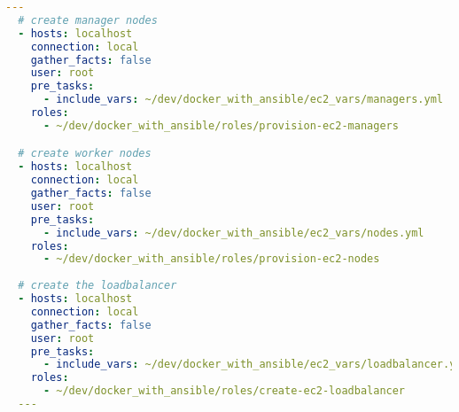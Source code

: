 \begin{lstlisting}[float,floatplacement=!ht,language=yaml,caption={create-instances.yml},label={lst:provisionEc2},basicstyle=\small]
  ---
  # create manager nodes 
  - hosts: localhost
    connection: local
    gather_facts: false
    user: root
    pre_tasks:
      - include_vars: ~/dev/docker_with_ansible/ec2_vars/managers.yml
    roles:
      - ~/dev/docker_with_ansible/roles/provision-ec2-managers

  # create worker nodes
  - hosts: localhost
    connection: local
    gather_facts: false
    user: root
    pre_tasks:
      - include_vars: ~/dev/docker_with_ansible/ec2_vars/nodes.yml
    roles:
      - ~/dev/docker_with_ansible/roles/provision-ec2-nodes
      
  # create the loadbalancer
  - hosts: localhost
    connection: local
    gather_facts: false
    user: root
    pre_tasks:
      - include_vars: ~/dev/docker_with_ansible/ec2_vars/loadbalancer.yml
    roles:
      - ~/dev/docker_with_ansible/roles/create-ec2-loadbalancer
  ---
\end{lstlisting}
